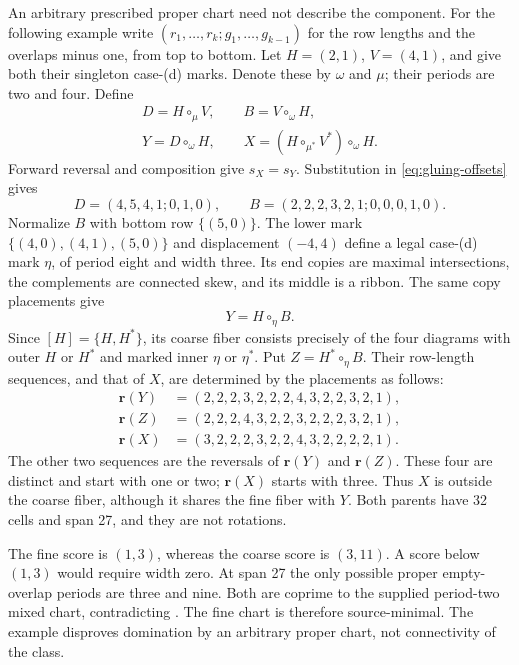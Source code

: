 \documentclass[11pt,a4paper]{amsart}
\numberwithin{equation}{section}
\theoremstyle{plain}
\theoremstyle{definition}
\begin{document}
An arbitrary prescribed proper chart need not describe the component.  For the following example write \((r_1,\ldots,r_k;g_1,\ldots,g_{k-1})\) for the row lengths and the overlaps minus one, from top to bottom.  Let \(H=(2,1)\), \(V=(4,1)\), and give both their singleton case-(d) marks.  Denote these by \(\omega\) and \(\mu\); their periods are two and four.  Define
\begin{equation}\label{eq:nonminimal-fiber}
 \begin{gathered}
 D=H\circ_\mu V,\qquad B=V\circ_\omega H,\\
 Y=D\circ_\omega H,\qquad
 X=(H\circ_{\mu^*}V^*)\circ_\omega H.
 \end{gathered}
\end{equation}
Forward reversal and composition give \(s_X=s_Y\).  Substitution in \eqref{eq:gluing-offsets} gives
\[
 D=(4,5,4,1;0,1,0),\qquad
 B=(2,2,2,3,2,1;0,0,0,1,0).
\]
Normalize \(B\) with bottom row \(\{(5,0)\}\).  The lower mark
\(\{(4,0),(4,1),(5,0)\}\) and displacement \((-4,4)\) define a legal case-(d) mark \(\eta\), of period eight and width three.  Its end copies are maximal intersections, the complements are connected skew, and its middle is a ribbon.  The same copy placements give
\[
 Y=H\circ_\eta B.
\]
Since \([H]=\{H,H^*\}\), its coarse fiber consists precisely of the four diagrams with outer \(H\) or \(H^*\) and marked inner \(\eta\) or \(\eta^*\).  Put \(Z=H^*\circ_\eta B\).  Their row-length sequences, and that of \(X\), are determined by the placements as follows:
\[
 \begin{aligned}
 \mathbf r(Y)&=(2,2,2,3,2,2,2,4,3,2,2,3,2,1),\\
 \mathbf r(Z)&=(2,2,2,4,3,2,2,3,2,2,2,3,2,1),\\
 \mathbf r(X)&=(3,2,2,2,3,2,2,4,3,2,2,2,2,1).
 \end{aligned}
\]
The other two sequences are the reversals of \(\mathbf r(Y)\) and \(\mathbf r(Z)\).  These four are distinct and start with one or two; \(\mathbf r(X)\) starts with three.  Thus \(X\) is outside the coarse fiber, although it shares the fine fiber with \(Y\).  Both parents have 32 cells and span 27, and they are not rotations.

The fine score is \((1,3)\), whereas the coarse score is \((3,11)\).  A score below \((1,3)\) would require width zero.  At span 27 the only possible proper empty-overlap periods are three and nine.  Both are coprime to the supplied period-two mixed chart, contradicting .  The fine chart is therefore source-minimal.  The example disproves domination by an arbitrary proper chart, not connectivity of the class.
\end{document}
